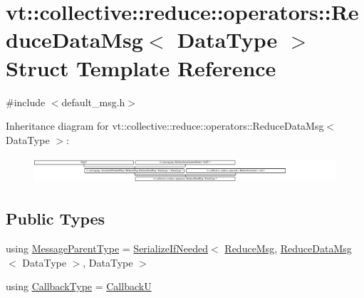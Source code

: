 \hypertarget{structvt_1_1collective_1_1reduce_1_1operators_1_1_reduce_data_msg}{}\section{vt\+:\+:collective\+:\+:reduce\+:\+:operators\+:\+:Reduce\+Data\+Msg$<$ Data\+Type $>$ Struct Template Reference}
\label{structvt_1_1collective_1_1reduce_1_1operators_1_1_reduce_data_msg}


{\ttfamily \#include $<$default\+\_\+msg.\+h$>$}

Inheritance diagram for vt\+:\+:collective\+:\+:reduce\+:\+:operators\+:\+:Reduce\+Data\+Msg$<$ Data\+Type $>$\+:\begin{figure}[H]
\begin{center}
\leavevmode
\includegraphics[height=1.001789cm]{structvt_1_1collective_1_1reduce_1_1operators_1_1_reduce_data_msg}
\end{center}
\end{figure}
\subsection*{Public Types}
\begin{DoxyCompactItemize}
\item 
using \hyperlink{structvt_1_1collective_1_1reduce_1_1operators_1_1_reduce_data_msg_a6b5182cf48445f9d03dc6e5905a4eba1}{Message\+Parent\+Type} = \hyperlink{namespacevt_a0a4ad8c256fcffa564e9fa7800e4b495}{Serialize\+If\+Needed}$<$ \hyperlink{structvt_1_1collective_1_1reduce_1_1_reduce_msg}{Reduce\+Msg}, \hyperlink{structvt_1_1collective_1_1reduce_1_1operators_1_1_reduce_data_msg}{Reduce\+Data\+Msg}$<$ Data\+Type $>$, Data\+Type $>$
\item 
using \hyperlink{structvt_1_1collective_1_1reduce_1_1operators_1_1_reduce_data_msg_a299d0d7f62e0e631ef344e345d89a4f3}{Callback\+Type} = \hyperlink{namespacevt_af79a43a97bc3593fc349f086c874c48e}{CallbackU}
\end{DoxyCompactItemize}
